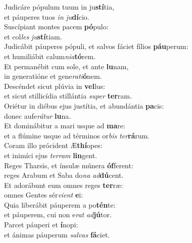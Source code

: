 \evenverse Judicáre pópulum tuum in ju\textbf{stí}tia,~\*\\
\evenverse et páuperes tuos \textit{in} \textit{ju}\textbf{dí}cio.\\
\oddverse Suscípiant montes pacem \textbf{pó}pulo:~\*\\
\oddverse et col\textit{les} \textit{ju}\textbf{stí}tiam.\\
\evenverse Judicábit páuperes pópuli, et salvos fáciet fílios \textbf{páu}perum:~\*\\
\evenverse et humiliábit calum\textit{ni}\textit{a}\textbf{tó}rem.\\
\oddverse Et permanébit cum sole, et ante \textbf{lu}nam,~\*\\
\oddverse in generatióne et gene\textit{ra}\textit{ti}\textbf{ó}nem.\\
\evenverse Descéndet sicut plúvia in \textbf{vel}lus:~\*\\
\evenverse et sicut stillicídia stillántia \textit{su}\textit{per} \textbf{ter}ram.\\
\oddverse Oriétur in diébus ejus justítia, et abundántia \textbf{pa}cis:~\*\\
\oddverse donec aufe\textit{rá}\textit{tur} \textbf{lu}na.\\
\evenverse Et dominábitur a mari usque ad \textbf{ma}re:~\*\\
\evenverse et a flúmine usque ad términos or\textit{bis} \textit{ter}\textbf{rá}rum.\\
\oddverse Coram illo prócident Æ\textbf{thí}opes:~\*\\
\oddverse et inimíci ejus \textit{ter}\textit{ram} \textbf{lin}gent.\\
\evenverse Reges Tharsis, et ínsulæ múnera \textbf{óf}ferent:~\*\\
\evenverse reges Arabum et Saba do\textit{na} \textit{ad}\textbf{dú}cent.\\
\oddverse Et adorábunt eum omnes reges \textbf{ter}ræ:~\*\\
\oddverse omnes Gentes sér\textit{vi}\textit{ent} \textbf{e}i:\\
\evenverse Quia liberábit páuperem a po\textbf{tén}te:~\*\\
\evenverse et páuperem, cui non e\textit{rat} \textit{ad}\textbf{jú}tor.\\
\oddverse Parcet páuperi et \textbf{í}nopi:~\*\\
\oddverse et ánimas páuperum \textit{sal}\textit{vas} \textbf{fá}ciet.\\
